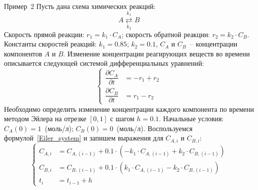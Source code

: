 \documentclass[aspectratio=169, mathserif]{beamer}	%
\begin{document}
\begin{frame}[fragile, label=c]{Пример~2}\label{slide:example2}
\scriptsize
Пусть дана схема химических реакций:
\vfill
$$
A \overset{k_1}{\underset{k_2}{\rightleftarrows}} B
$$
\vfill
Скорость прямой реакции: $r_1 = k_1 \cdot C_A$; скорость обратной реакции:
$r_2 = k_2 \cdot C_B$. Константы скоростей реакций: $k_1 = 0.85$; $k_2 = 0.1$, $C_A$ и $C_B$~-- концентрации компонентов $A$ и $B$.
Изменение концентрации реагирующих веществ во времени описывается следующей системой дифференциальных уравнений:
\vfill
\begin{equation*}
	\left\{
	\begin{aligned}
		\dfrac{\partial C_A}{\partial t} &= -r_1 + r_2 \\
		\dfrac{\partial C_B}{\partial t} &= r_1 - r_2
	\end{aligned}
	\right.
\end{equation*}
\vfill
Необходимо определить изменение концентрации каждого компонента по времени методом Эйлера на отрезке $[0, 1]$ с  шагом $h=0.1$. Начальные условия: $C_A(0) = 1$~(моль/л); $C_B(0) = 0$~(моль/л).
\vfill
Воспользуемся формулой~\eqref{Eiler_system} и запишем выражения для $C_{A,i}$ и $C_{B,i}$:
\vfill
\begin{equation*}
	\left\{
	\begin{aligned}
		C_{A, i} &= C_{A, (i-1)} + 0.1 \cdot \left(-k_1\cdot C_{A, (i-1)} + k_2 \cdot C_{B, (i-1)}\right) \\
		C_{B, i} &= C_{B, (i-1)} + 0.1 \cdot \left(k_1\cdot C_{A, (i-1)} - k_2 \cdot C_{B, (i-1)}\right) \\
		t_i &= t_{i-1} + h
	\end{aligned}
	\right.
\end{equation*}
\vfill
\end{frame}


\end{document}
